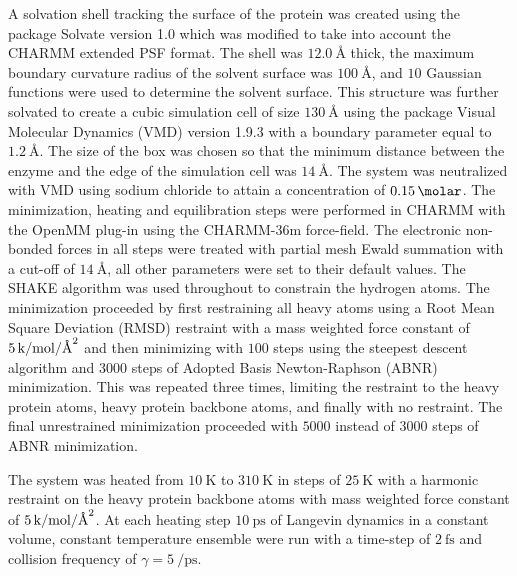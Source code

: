 A solvation shell tracking the surface of the protein was created using the package Solvate version 1.0 \cite{grubmullerSolvate} which was modified to take into account the CHARMM extended PSF format. The shell was $\SI{12.0}{\angstrom}$ thick, the maximum boundary curvature radius of the solvent surface was $\SI{100}{\angstrom}$, and $10$ Gaussian functions were used to determine the solvent surface. This structure was further solvated to create a cubic simulation cell of size $\SI{130}{\angstrom}$ using the package Visual Molecular Dynamics (VMD) version 1.9.3 \cite{HUMP96} with a boundary parameter equal to $\SI{1.2}{\angstrom}$. The size of the box was chosen so that the minimum distance between the enzyme and the edge of the simulation cell was  $\SI{14}{\angstrom}$. The system was neutralized with VMD using sodium chloride to attain a concentration of $\SI{0.15}{\molar}$. 
The minimization, heating and equilibration steps were performed in CHARMM with the OpenMM \cite{OpenMMRapidDevelopment} plug-in using the CHARMM-36m \cite{huangCHARMM36AllatomAdditive2013} force-field. The electronic non-bonded forces in all steps were treated with partial mesh Ewald summation with a cut-off of $\SI{14}{\angstrom}$, all other parameters were set to their default values. The SHAKE \cite{ryckaertNumericalIntegrationCartesian1977b} algorithm was used throughout to constrain the hydrogen atoms. The minimization proceeded by first restraining all heavy atoms  using a Root Mean Square Deviation (RMSD) restraint with a mass weighted force constant of $\SI{5}{\kilo\cal\per\mol\per\square\angstrom}$ and then minimizing with $100$ steps using the steepest descent algorithm and $3000$ steps of Adopted Basis Newton-Raphson (ABNR) minimization. This was repeated three times,  limiting the  restraint to the heavy protein atoms, heavy protein backbone atoms, and finally with no restraint. The final unrestrained minimization proceeded with $5000$ instead of $3000$ steps of ABNR minimization. 

The system was heated from $\SI{10}{\kelvin}$ to $\SI{310}{\kelvin}$ in steps of $\SI{25}{\kelvin}$ with a harmonic restraint on the heavy protein backbone atoms with mass weighted force constant of $\SI{5}{\kilo\cal\per\mol\per\square\angstrom}$. At each heating step $\SI{10}{\pico\second}$ of Langevin dynamics in a constant volume, constant temperature ensemble were run with a time-step of $\SI{2}{\femto\second}$ and collision frequency of $\gamma=\SI{5}{\per\pico\second}$. 

